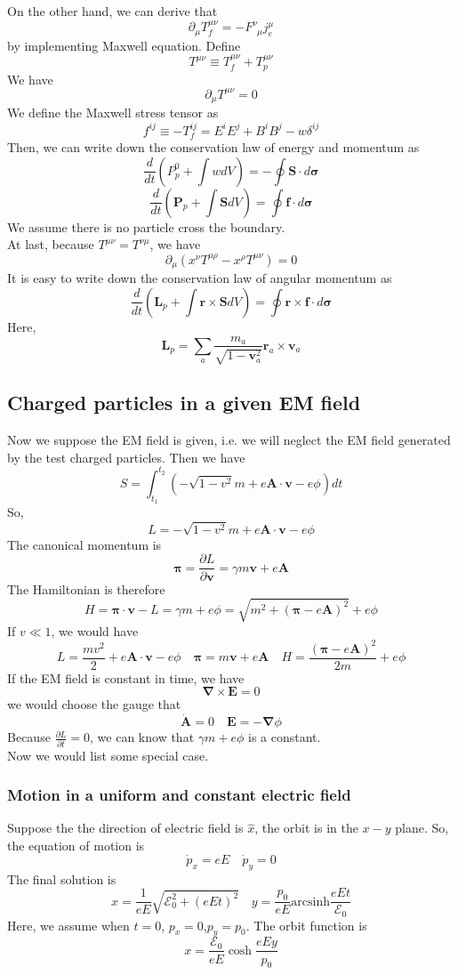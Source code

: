\documentclass[cyan]{elegantnote}
\begin{document}
On the other hand, we can derive that
\[\partial_{\mu} T_f^{\mu\nu} = - F^{\nu}_{\phantom{\nu}\mu}j_e^{\mu}\]
by implementing Maxwell equation.
Define
\[T^{\mu \nu} \equiv T_f^{\mu\nu} + T_p^{\mu\nu}\]
We have
\[\partial_{\mu} T^{\mu\nu} = 0\]
We define the Maxwell stress tensor as
\[f^{ij} \equiv -T_f^{ij} = E^{i}E^{j} + B^{i}B^{j} - w\delta^{ij}\]
Then, we can write down the conservation law of energy and momentum as
\[\frac{d}{dt}\left(P_p^0 + \int w dV \right) = -\oint \bm{S}\cdot d\bm{\sigma}\]
\[\frac{d}{dt}\left(\bm{P}_p + \int \bm{S} dV \right) = \oint \bm{f}\cdot d\bm{\sigma}\]
We assume there is no particle cross the boundary.\\
At last, because $T^{\mu\nu} = T^{\nu\mu}$, we have
\[\partial_{\mu}(x^{\nu}T^{\mu\rho}-x^{\rho}T^{\mu\nu}) = 0\]
It is easy to write down the conservation law of angular momentum as
\[\frac{d}{dt}\left(\bm{L}_p + \int \bm{r} \times \bm{S} dV \right) = \oint \bm{r} \times \bm{f}\cdot d\bm{\sigma}\]
Here,
\[\bm{L}_p = \sum_a \frac{m_a}{\sqrt{1-\bm{v}_a^2}} \bm{r}_a  \times \bm{v}_a \]

\subsection{Charged particles in a given EM field}
Now we suppose the EM field is given, i.e. we will neglect the EM field generated by the test charged particles. Then we have
\[S = \int_{t_1}^{t_2} (-\sqrt{1-v^2}m + e\bm{A}\cdot\bm{v}-e\phi)dt\]
So,
\[L = -\sqrt{1-v^2}m + e\bm{A}\cdot\bm{v}-e\phi\]
The canonical momentum is
\[\bm{\pi} = \frac{\partial L}{\partial \bm{v}} = \gamma m \bm{v} + e \bm{A}\]
The Hamiltonian is therefore
\[H = \bm{\pi} \cdot \bm{v} - L = \gamma m + e \phi = \sqrt{m^2+(\bm{\pi}-e\bm{A})^2}+e\phi\]
If $v \ll 1$, we would have
\[L = \frac{mv^2}{2} + e\bm{A}\cdot\bm{v}-e\phi \quad \bm{\pi} =  m \bm{v} + e \bm{A} \quad H = \frac{(\bm{\pi}-e\bm{A})^2}{2m}+e\phi\]
If the EM field is constant in time, we have
\[\bm{\nabla} \times \bm{E} = 0\]
we would choose the gauge that
\[\dot{\bm{A}} = 0 \quad \bm{E} = -\bm{\nabla} \phi\]
Because $\frac{\partial L}{\partial t}=0$, we can know that $\gamma m + e\phi$ is a constant.\\
Now we would list some special case.
\subsubsection{Motion in a uniform and constant electric field}
Suppose the the direction of electric field is  $\hat{x}$, the orbit is in the $x-y$ plane. So, the equation of motion is
\[\dot{p}_x = eE \quad \dot{p}_y = 0\]
The final solution is
\[x = \frac{1}{eE}\sqrt{\mathcal{E}_0^2 + (eEt)^2} \quad y = \frac{p_0}{eE} \mathrm{arcsinh} \frac{eEt}{\mathcal{E}_0}\]
Here, we assume when $t=0$, $p_x = 0$,$p_y=p_0$.
The orbit function is
\[x = \frac{\mathcal{E}_0}{eE}\cosh \frac{eEy}{p_0}\]
\end{document}
